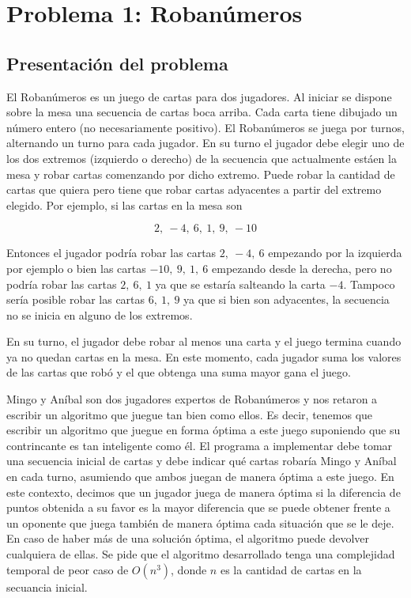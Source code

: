 \section{Problema 1: Roban\'umeros}

\subsection{Presentaci\'on del problema}
El Roban\'umeros es un juego de cartas para dos jugadores. Al iniciar se dispone sobre la mesa una secuencia
de cartas boca arriba. Cada carta tiene dibujado un n\'umero entero (no necesariamente positivo). El
Roban\'umeros se juega por turnos, alternando un turno para cada jugador. En su turno el jugador debe
elegir uno de los dos extremos (izquierdo o derecho) de la secuencia que actualmente est\'aen la mesa y
robar cartas comenzando por dicho extremo. Puede robar la cantidad de cartas que quiera pero tiene que
robar cartas adyacentes a partir del extremo elegido. Por ejemplo, si las cartas en la mesa son

$$ 2, ~ -4, ~ 6, ~ 1, ~ 9, ~ -10 $$

Entonces el jugador podr\'ia robar las cartas $2, ~ -4, ~ 6$ empezando por la izquierda por ejemplo o bien
las cartas $-10, ~ 9, ~ 1, ~ 6$ empezando desde la derecha, pero no podr\'ia robar las cartas $2, ~ 6, ~ 1$
ya que se estar\'ia salteando la carta $-4$. Tampoco ser\'ia posible robar las cartas $6, ~ 1, ~ 9$ ya que si
bien son adyacentes, la secuencia no se inicia en alguno de los extremos.


En su turno, el jugador debe robar al menos una carta y el juego termina cuando ya no quedan cartas
en la mesa. En este momento, cada jugador suma los valores de las cartas que rob\'o y el que obtenga una
suma mayor gana el juego.

Mingo y An\'ibal son dos jugadores expertos de Roban\'umeros y nos retaron a escribir un algoritmo que
juegue tan bien como ellos. Es decir, tenemos que escribir un algoritmo que juegue en forma \'optima a
este juego suponiendo que su contrincante es tan inteligente como \'el. El programa a implementar debe
tomar una secuencia inicial de cartas y debe indicar qu\'e cartas robar\'ia Mingo y An\'ibal en cada turno,
asumiendo que ambos juegan de manera \'optima a este juego. En este contexto, decimos que un jugador
juega de manera \'optima si la diferencia de puntos obtenida a su favor es la mayor diferencia que se puede
obtener frente a un oponente que juega tambi\'en de manera \'optima cada situaci\'on que se le deje. En caso
de haber m\'as de una soluci\'on \'optima, el algoritmo puede devolver cualquiera de ellas. Se pide que el
algoritmo desarrollado tenga una complejidad temporal de peor caso de $O(n^3)$, donde $n$ es la cantidad
de cartas en la secuancia inicial.

